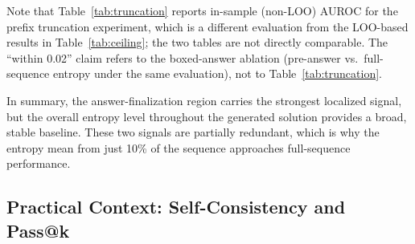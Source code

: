 \documentclass{article}
\begin{document}
Note that Table~\ref{tab:truncation} reports in-sample (non-LOO) AUROC for the prefix truncation experiment, which is a different evaluation from the LOO-based results in Table~\ref{tab:ceiling}; the two tables are not directly comparable. The ``within 0.02'' claim refers to the boxed-answer ablation (pre-answer vs.\ full-sequence entropy under the same evaluation), not to Table~\ref{tab:truncation}.

\begin{table}[t]
\centering
\caption{Prefix truncation on hard problems; in-sample AUROC using first $k$/10 of the sequence.}
\label{tab:truncation}
\end{table}

In summary, the answer-finalization region carries the strongest localized signal, but the overall entropy level throughout the generated solution provides a broad, stable baseline. These two signals are partially redundant, which is why the entropy mean from just 10\% of the sequence approaches full-sequence performance.

\subsection{Practical Context: Self-Consistency and Pass@k}

\begin{table}[t]
\centering
\caption{Majority voting accuracy and pass@$k$ on hard problems.}
\label{tab:selfconsistency}
\end{table}
\end{document}
